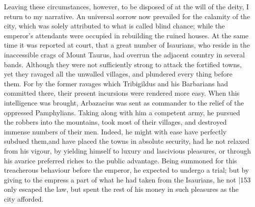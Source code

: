 Leaving these circumstances, however, to be disposed of at the will of the deity, I return to my narrative. An universal sorrow now prevailed for the calamity of the city, which was solely attributed to what is called blind chance; while the emperor's attendants were occupied in rebuilding the ruined houses. At the same time it was reported at court, that a great number of Isaurians, who reside in the inaccessible crags of Mount Taurus, had overrun the adjacent country in several bands. Although they were not sufficiently strong to attack the fortified towns, yet they ravaged all the unwalled villages, and plundered every thing before them. For by the former ravages which Tribigildus and his Barbarians had committed there, their present incursions were rendered more easy. When this intelligence was brought, Arbazacius was sent as commander to the relief of the oppressed Pamphylians. Taking along with him a competent army, he pursued the robbers into the mountains, took most of their villages, and destroyed immense numbers of their men. Indeed, he might with ease have perfectly subdued them,and have placed the towns in absolute security, had he not relaxed from his vigour, by yielding himself to luxury and lascivious pleasures, or through his avarice preferred riches to the public advantage. Being summoned for this treacherous behaviour before the emperor, he expected to undergo a trial; but by giving to the empress a part of what he had taken from
the Isaurians, he not |153 only escaped the law, but spent the rest of his money in such pleasures as the city afforded.

